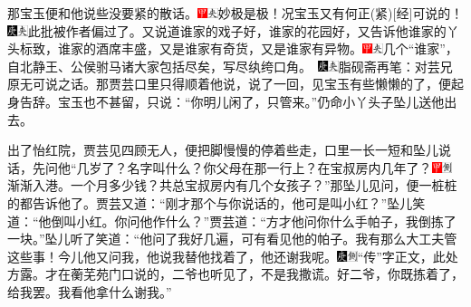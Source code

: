 那宝玉便和他说些没要紧的散话。{{\includegraphics[width=3mm]{../Images/00002}\includegraphics[width=3mm]{../Images/00012}\footnotesize \kaishu 妙极是极！况宝玉又有何正{(紧)}{[}经{]}可说的！　\includegraphics[width=3mm]{../Images/00004}\includegraphics[width=3mm]{../Images/00012}\footnotesize \kaishu 此批被作者偏过了。}}又说道谁家的戏子好，谁家的花园好，又告诉他谁家的丫头标致，谁家的酒席丰盛，又是谁家有奇货，又是谁家有异物。{{\includegraphics[width=3mm]{../Images/00002}\includegraphics[width=3mm]{../Images/00012}\footnotesize \kaishu 几个``谁家''，自北静王、公侯驸马诸大家包括尽矣，写尽纨绔口角。　}\includegraphics[width=3mm]{../Images/00004}\includegraphics[width=3mm]{../Images/00012}\footnotesize \kaishu 脂砚斋再笔：对芸兄原无可说之话。}那贾芸口里只得顺着他说，说了一回，见宝玉有些懒懒的了，便起身告辞。宝玉也不甚留，只说：``你明儿闲了，只管来。''仍命小丫头子坠儿送他出去。

出了怡红院，贾芸见四顾无人，便把脚慢慢的停着些走，口里一长一短和坠儿说话，先问他``几岁了？名字叫什么？你父母在那一行上？在宝叔房内几年了？{\includegraphics[width=3mm]{../Images/00002}\includegraphics[width=3mm]{../Images/00011}\footnotesize \kaishu 渐渐入港。}一个月多少钱？共总宝叔房内有几个女孩子？''那坠儿见问，便一桩桩的都告诉他了。贾芸又道：``刚才那个与你说话的，他可是叫小红？''坠儿笑道：``他倒叫小红。你问他作什么？''贾芸道：``方才他问你什么手帕子，我倒拣了一块。''坠儿听了笑道：``他问了我好几遍，可有看见他的帕子。我有那么大工夫管这些事！今儿他又问我，他说我替他找着了，他还谢我呢。{\includegraphics[width=3mm]{../Images/00004}\includegraphics[width=3mm]{../Images/00011}\footnotesize \kaishu ``传''字正文，此处方露。}才在蘅芜苑门口说的，二爷也听见了，不是我撒谎。好二爷，你既拣着了，给我罢。我看他拿什么谢我。''

